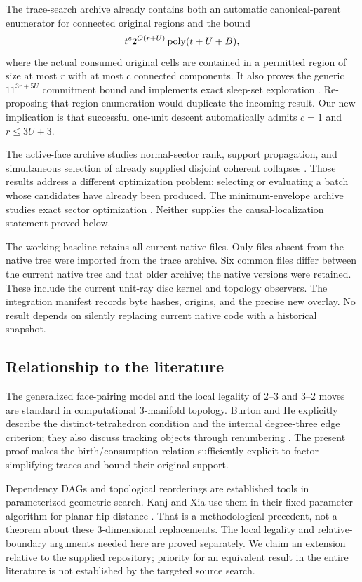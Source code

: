 The trace-search archive already contains both an automatic canonical-parent
enumerator for connected original regions and the bound
\begin{equation}\label{eq:prior-bound}
 t^c2^{O(r+U)}\operatorname{poly}(t+U+B),
\end{equation}
where the actual consumed original cells are contained in a permitted region
of size at most $r$ with at most $c$ connected components. It also proves the
generic $11^{3r+5U}$ commitment bound and implements exact sleep-set exploration
\cite{incoming-trace}. Re-proposing that region enumeration would duplicate the
incoming result. Our new implication is that successful one-unit descent
automatically admits $c=1$ and $r\le3U+3$.

The active-face archive studies normal-sector rank, support propagation, and
simultaneous selection of already supplied disjoint coherent collapses
\cite{incoming-active}. Those results address a different optimization problem:
selecting or evaluating a batch whose candidates have already been produced.
The minimum-envelope archive studies exact sector optimization
\cite{incoming-envelope}. Neither supplies the causal-localization statement
proved below.

The working baseline retains all current native files. Only files absent from
the native tree were imported from the trace archive. Six common files differ
between the current native tree and that older archive; the native versions
were retained. These include the current unit-ray disc kernel and topology
observers. The integration manifest records byte hashes, origins, and the
precise new overlay. No result depends on silently replacing current native
code with a historical snapshot.

\subsection{Relationship to the literature}

The generalized face-pairing model and the local legality of $2$--$3$ and
$3$--$2$ moves are standard in computational $3$-manifold topology. Burton
and He explicitly describe the distinct-tetrahedron condition and the
internal degree-three edge criterion; they also discuss tracking objects
through renumbering \cite{burton-he-counterexamples}. The present proof makes
the birth/consumption relation sufficiently explicit to factor simplifying
traces and bound their original support.

Dependency DAGs and topological reorderings are established tools in
parameterized geometric search. Kanj and Xia use them in their fixed-parameter
algorithm for planar flip distance \cite{kanj-xia}. That is a methodological
precedent, not a theorem about these $3$-dimensional replacements. The local
legality and relative-boundary arguments needed here are proved separately.
We claim an extension relative to the supplied repository; priority for an
equivalent result in the entire literature is not established by the targeted
source search.

